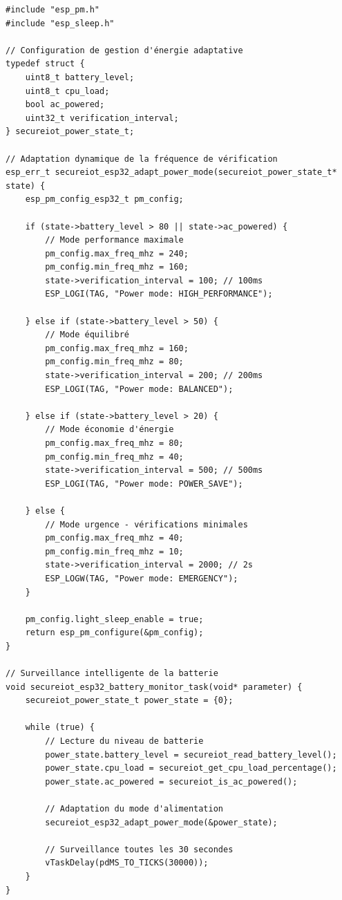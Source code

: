 \begin{lstlisting}[caption={Gestion énergétique intelligente}]
#include "esp_pm.h"
#include "esp_sleep.h"

// Configuration de gestion d'énergie adaptative
typedef struct {
    uint8_t battery_level;
    uint8_t cpu_load;
    bool ac_powered;
    uint32_t verification_interval;
} secureiot_power_state_t;

// Adaptation dynamique de la fréquence de vérification
esp_err_t secureiot_esp32_adapt_power_mode(secureiot_power_state_t* state) {
    esp_pm_config_esp32_t pm_config;
    
    if (state->battery_level > 80 || state->ac_powered) {
        // Mode performance maximale
        pm_config.max_freq_mhz = 240;
        pm_config.min_freq_mhz = 160;
        state->verification_interval = 100; // 100ms
        ESP_LOGI(TAG, "Power mode: HIGH_PERFORMANCE");
        
    } else if (state->battery_level > 50) {
        // Mode équilibré
        pm_config.max_freq_mhz = 160;
        pm_config.min_freq_mhz = 80;
        state->verification_interval = 200; // 200ms
        ESP_LOGI(TAG, "Power mode: BALANCED");
        
    } else if (state->battery_level > 20) {
        // Mode économie d'énergie
        pm_config.max_freq_mhz = 80;
        pm_config.min_freq_mhz = 40;
        state->verification_interval = 500; // 500ms
        ESP_LOGI(TAG, "Power mode: POWER_SAVE");
        
    } else {
        // Mode urgence - vérifications minimales
        pm_config.max_freq_mhz = 40;
        pm_config.min_freq_mhz = 10;
        state->verification_interval = 2000; // 2s
        ESP_LOGW(TAG, "Power mode: EMERGENCY");
    }
    
    pm_config.light_sleep_enable = true;
    return esp_pm_configure(&pm_config);
}

// Surveillance intelligente de la batterie
void secureiot_esp32_battery_monitor_task(void* parameter) {
    secureiot_power_state_t power_state = {0};
    
    while (true) {
        // Lecture du niveau de batterie
        power_state.battery_level = secureiot_read_battery_level();
        power_state.cpu_load = secureiot_get_cpu_load_percentage();
        power_state.ac_powered = secureiot_is_ac_powered();
        
        // Adaptation du mode d'alimentation
        secureiot_esp32_adapt_power_mode(&power_state);
        
        // Surveillance toutes les 30 secondes
        vTaskDelay(pdMS_TO_TICKS(30000));
    }
}
\end{lstlisting}

